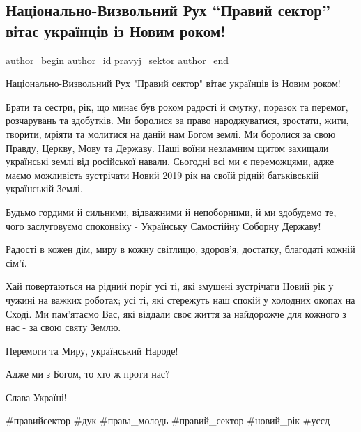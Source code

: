  
 
 
 
 
 
\subsection{Національно-Визвольний Рух \enquote{Правий сектор} вітає українців із Новим роком!}
\label{sec:31_12_2018.fb.pravyj_sektor.1.z_novym_rokom}
 
\ifcmt
 author_begin
   author_id pravyj_sektor
 author_end
\fi

Національно-Визвольний Рух "Правий сектор" вітає українців із Новим роком! 


Брати та сестри, рік, що минає був роком радості й смутку, поразок та перемог,
розчарувань та здобутків. Ми боролися за право народжуватися, зростати, жити,
творити, мріяти та молитися на даній нам Богом землі. Ми боролися за свою
Правду, Церкву, Мову та Державу. Наші воїни незламним щитом захищали українські
землі від російської навали. Сьогодні всі ми є переможцями, адже  маємо
можливість зустрічати Новий 2019 рік на своїй рідній батьківській українській
Землі. 

Будьмо гордими й сильними, відважними й непоборними, й ми здобудемо те, чого
заслуговуємо споконвіку - Українську Самостійну Соборну Державу! 

Радості в кожен дім, миру в кожну світлицю, здоров'я, достатку, благодаті
кожній сім'ї. 

Хай повертаються на рідний поріг усі ті, які змушені зустрічати Новий рік у
чужині на важких роботах; усі ті, які стережуть наш спокій у холодних окопах на
Сході. Ми пам'ятаємо Вас, які віддали своє життя за найдорожче для кожного з
нас - за свою святу Землю. 

Перемоги та Миру, український Народе! 

Адже ми з Богом, то хто ж проти нас? 

Слава Україні!

\#правийсектор \#дук \#права\_молодь \#правий\_сектор \#новий\_рік \#уссд
